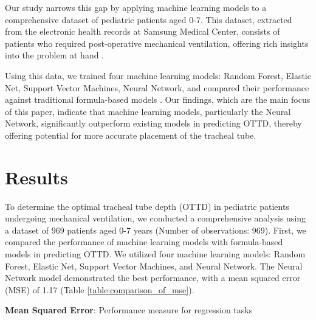 \documentclass[11pt]{article}
\begin{document}
Our study narrows this gap by applying machine learning models to a comprehensive dataset of pediatric patients aged 0-7. This dataset, extracted from the electronic health records at Samsung Medical Center, consists of patients who required post-operative mechanical ventilation, offering rich insights into the problem at hand \cite{Ingelse2017EarlyFO, Lee2009BedsidePO}.

Using this data, we trained four machine learning models: Random Forest, Elastic Net, Support Vector Machines, Neural Network, and compared their performance against traditional formula-based models \cite{Cheng2016RiskPW}. Our findings, which are the main focus of this paper, indicate that machine learning models, particularly the Neural Network, significantly outperform existing models in predicting OTTD, thereby offering potential for more accurate placement of the tracheal tube.

\section*{Results}

To determine the optimal tracheal tube depth (OTTD) in pediatric patients undergoing mechanical ventilation, we conducted a comprehensive analysis using a dataset of 969 patients aged 0-7 years (Number of observations: 969). First, we compared the performance of machine learning models with formula-based models in predicting OTTD. We utilized four machine learning models: Random Forest, Elastic Net, Support Vector Machines, and Neural Network. The Neural Network model demonstrated the best performance, with a mean squared error (MSE) of 1.17 (Table {}\ref{table:comparison_of_mse}).

\begin{table}[h]
\caption{Comparison of Mean Squared Error between Machine Learning Model and Formula-Based Models}
\label{table:comparison_of_mse}
\begin{threeparttable}
\renewcommand{\TPTminimum}{\linewidth}
\begin{tablenotes}
\footnotesize
\item \textbf{Mean Squared Error}: Performance measure for regression tasks
\end{tablenotes}
\end{threeparttable}
\end{table}
\end{document}
